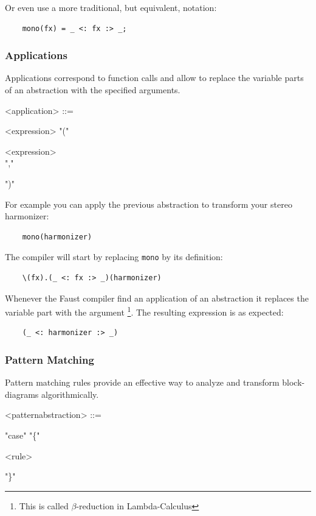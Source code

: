 \documentclass[a4paper]{book}
\begin{document}
Or even use a more traditional, but equivalent, notation:
\begin{lstlisting}
	mono(fx) = _ <: fx :> _;
\end{lstlisting}


\subsubsection{Applications}
Applications correspond to function calls and allow to replace the variable parts of an abstraction with the specified arguments.

\begin{grammar}
  <application> ::= 
  \begin{syntdiag}
    <expression> "(" 
    \begin{rep}
      <expression> \\ ","
    \end{rep}
    ")"
  \end{syntdiag}
\end{grammar}

For example you can apply the previous abstraction to transform your stereo harmonizer:
\begin{lstlisting}
	mono(harmonizer)
\end{lstlisting}

The compiler will start by replacing \lstinline'mono' by its definition:
\begin{lstlisting}
	\(fx).(_ <: fx :> _)(harmonizer)
\end{lstlisting}

Whenever the Faust compiler find an application of an abstraction it replaces the variable part with the argument \footnote{This is called $\beta$-reduction in Lambda-Calculus}. The resulting expression is as expected:
\begin{lstlisting}
	(_ <: harmonizer :> _)
\end{lstlisting}



\subsubsection{Pattern Matching}
Pattern matching rules provide an effective way to analyze and transform block-diagrams algorithmically.

\begin{grammar}
  <patternabstraction> ::= 
  \begin{syntdiag} 
    "case" "\{"
    \begin{rep}
      <rule>
    \end{rep}
    "\}"
  \end{syntdiag}
\end{grammar}
\end{document}
